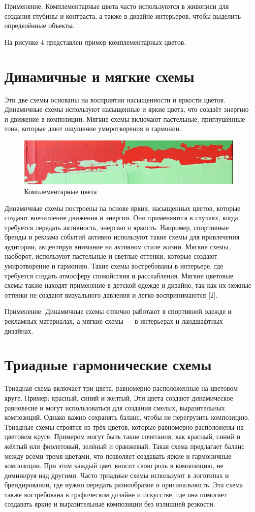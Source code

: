 \documentclass[bachelor, och, referat]{SCWorks}
\begin{document}
Применение. Комплементарные цвета часто используются в живописи для создания глубины и контраста, а также в дизайне интерьеров, чтобы выделить определённые объекты.

На рисунке 4 представлен пример комплементарных цветов.
\section{Динамичные и мягкие схемы}
Эти две схемы основаны на восприятии насыщенности и яркости цветов. Динамичные схемы используют насыщенные и яркие цвета, что создаёт энергию и движение в композиции. Мягкие схемы включают пастельные, приглушённые тона, которые дают ощущение умиротворения и гармонии.
\begin{figure}
        \includegraphics[width=0.6\linewidth]{complementary_example.png} 
        \caption{Комплементарные цвета}
 \end{figure}
Динамичные схемы построены на основе ярких, насыщенных цветов, которые создают впечатление движения и энергии. Они применяются в случаях, когда требуется передать активность, энергию и яркость. Например, спортивные бренды и реклама событий активно используют такие схемы для привлечения аудитории, акцентируя внимание на активном стиле жизни.
Мягкие схемы, наоборот, используют пастельные и светлые оттенки, которые создают умиротворение и гармонию. Такие схемы востребованы в интерьере, где требуется создать атмосферу спокойствия и расслабления. Мягкие цветовые схемы также находят применение в детской одежде и дизайне, так как их нежные оттенки не создают визуального давления и легко воспринимаются [2].

Применение. Динамичные схемы отлично работают в спортивной одежде и рекламных материалах, а мягкие схемы — в интерьерах и ландшафтных дизайнах.

\section{Триадные гармонические схемы}
Триадная схема включает три цвета, равномерно расположенные на цветовом круге. Пример: красный, синий и жёлтый. Эти цвета создают динамическое равновесие и могут использоваться для создания смелых, выразительных композиций. Однако важно сохранять баланс, чтобы не перегрузить композицию.
Триадные схемы строятся из трёх цветов, которые равномерно расположены на цветовом круге. Примером могут быть такие сочетания, как красный, синий и жёлтый или фиолетовый, зелёный и оранжевый. Такая схема предлагает баланс между всеми тремя цветами, что позволяет создавать яркие и гармоничные композиции. При этом каждый цвет вносит свою роль в композицию, не доминируя над другими.
Часто триадные схемы используют в логотипах и брендировании, где нужно передать разнообразие и оригинальность. Эта схема также востребована в графическом дизайне и искусстве, где она помогает создавать яркие и выразительные композиции без излишней резкости.
\end{document}
